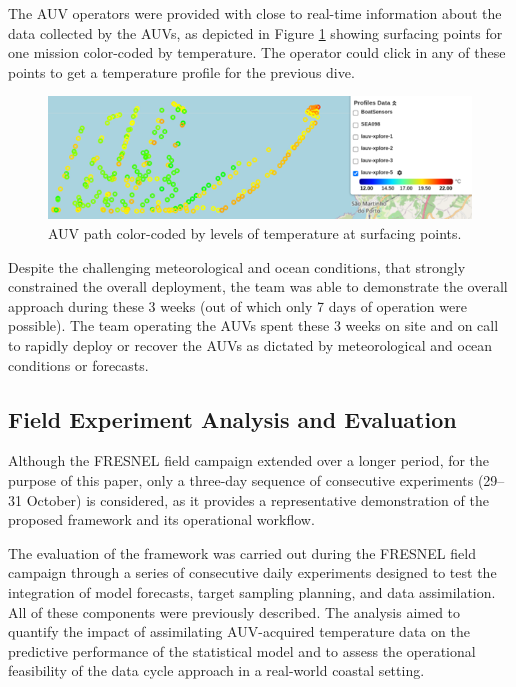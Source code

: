 The AUV operators were provided with close to real-time information
about the data collected by the AUVs, as depicted in Figure
\ref{fig:temperatureprofiles} showing surfacing points for one mission
color-coded by temperature. The operator could click in any of these
points to get a temperature profile for the previous dive.

 \begin{figure}
    \centering
    \includegraphics[width=.7\linewidth]{fig/temperatureprofiles.png}
    \caption{AUV path color-coded by levels of temperature at surfacing points.}
    \label{fig:temperatureprofiles}
\end{figure}



Despite the challenging meteorological and ocean conditions, that
strongly constrained the overall deployment, the \proj team was able to
demonstrate the overall approach during these 3 weeks (out of which only
7 days of operation were possible). The team operating the AUVs spent
these 3 weeks on site and on call to rapidly deploy or recover the AUVs
as dictated by meteorological and ocean conditions or forecasts.



\subsection{Field Experiment Analysis and Evaluation}

Although the FRESNEL field campaign extended over a longer period, for
the purpose of this paper, only a three-day sequence of consecutive
experiments (29–31 October) is considered, as it provides a
representative demonstration of the proposed framework and its
operational workflow.

The evaluation of the framework was carried out during the FRESNEL
field campaign through a series of consecutive daily experiments
designed to test the integration of model forecasts, target sampling
planning, and data assimilation. All of these components were
previously described. The analysis aimed to quantify the impact of
assimilating AUV-acquired temperature data on the predictive
performance of the statistical model and to assess the operational
feasibility of the data cycle approach in a real-world coastal
setting.


